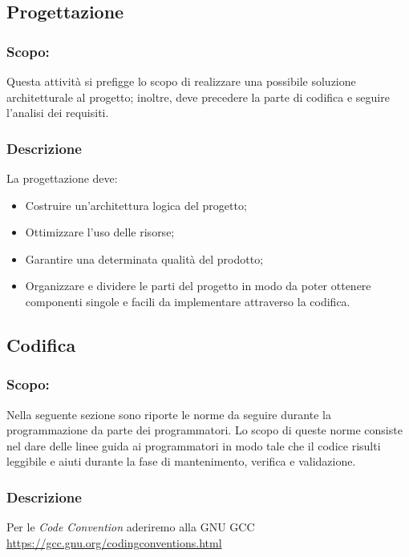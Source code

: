 \documentclass[../NomeDocumento.tex]{subfiles}
\begin{document}
\subsection{Progettazione} 
\subsubsection{Scopo:} Questa attività si prefigge lo scopo di realizzare una possibile soluzione architetturale al progetto; inoltre, deve precedere la parte di codifica e seguire l’analisi dei requisiti.
\subsubsection{Descrizione}
La progettazione deve:
\begin{itemize}
\item Costruire un’architettura logica del progetto;
\item Ottimizzare l’uso delle risorse;
\item Garantire una determinata qualità del prodotto;
\item Organizzare e dividere le parti del progetto in modo da poter ottenere componenti singole e facili da implementare attraverso la codifica. 
\end{itemize}
\subsection{Codifica}
\subsubsection{Scopo:}Nella seguente sezione sono riporte le norme da seguire durante la programmazione da parte dei programmatori. Lo scopo di queste norme consiste nel dare delle linee guida ai programmatori in modo tale che il codice risulti leggibile e aiuti durante la fase di mantenimento, verifica e validazione.
\subsubsection{Descrizione}
Per le \emph{Code Convention} aderiremo alla GNU GCC \url{https://gcc.gnu.org/codingconventions.html}
\end{document}
